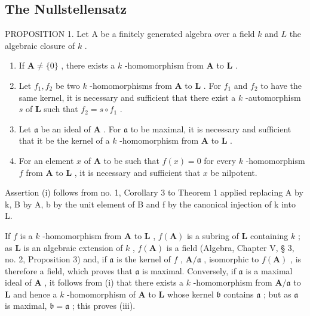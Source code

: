 \subsection{The Nullstellensatz}

PROPOSITION 1. Let A be a finitely generated algebra over a field \(k\) and \(L\) the algebraic closure of \(k\) .

\begin{enumerate}
\def\labelenumi{(\roman{enumi})}
\item
  If \(\mathbf{A} \neq \{0\}\) , there exists a \(k\) -homomorphism from \(\mathbf{A}\) to \(\mathbf{L}\) .
\item
  Let \(f_{1}, f_{2}\) be two \(k\) -homomorphisms from \(\mathbf{A}\) to \(\mathbf{L}\) . For \(f_{1}\) and \(f_{2}\) to have the same kernel, it is necessary and sufficient that there exist a \(k\) -automorphism \(s\) of \(\mathbf{L}\) such that \(f_{2} = s \circ f_{1}\) .
\item
  Let \(\mathfrak{a}\) be an ideal of \(\mathbf{A}\) . For \(\mathfrak{a}\) to be maximal, it is necessary and sufficient that it be the kernel of a \(k\) -homomorphism from \(\mathbf{A}\) to \(\mathbf{L}\) .
\item
  For an element \(x\) of \(\mathbf{A}\) to be such that \(f(x) = 0\) for every \(k\) -homomorphism \(f\) from \(\mathbf{A}\) to \(\mathbf{L}\) , it is necessary and sufficient that \(x\) be nilpotent.
\end{enumerate}

Assertion (i) follows from no. 1, Corollary 3 to Theorem 1 applied replacing A by k, B by A, b by the unit element of B and f by the canonical injection of k into L.

If \(f\) is a \(k\) -homomorphism from \(\mathbf{A}\) to \(\mathbf{L}\) , \(f(\mathbf{A})\) is a subring of \(\mathbf{L}\) containing \(k\) ; as \(\mathbf{L}\) is an algebraic extension of \(k\) , \(f(\mathbf{A})\) is a field (Algebra, Chapter V, § 3, no. 2, Proposition 3) and, if \(\mathfrak{a}\) is the kernel of \(f\) , \(\mathbf{A} / \mathfrak{a}\) , isomorphic to \(f(\mathbf{A})\) , is therefore a field, which proves that \(\mathfrak{a}\) is maximal. Conversely, if \(\mathfrak{a}\) is a maximal ideal of \(\mathbf{A}\) , it follows from (i) that there exists a \(k\) -homomorphism from \(\mathbf{A} / \mathfrak{a}\) to \(\mathbf{L}\) and hence a \(k\) -homomorphism of \(\mathbf{A}\) to \(\mathbf{L}\) whose kernel \(\mathfrak{b}\) contains \(\mathfrak{a}\) ; but as \(\mathfrak{a}\) is maximal, \(\mathfrak{b} = \mathfrak{a}\) ; this proves (iii).

